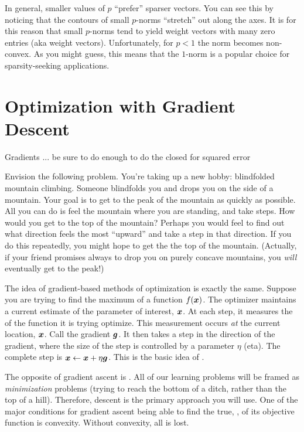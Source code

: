 
In general, smaller values of $p$ ``prefer'' sparser vectors.  You can
see this by noticing that the contours of small $p$-norms ``stretch''
out along the axes.  It is for this reason that small $p$-norms tend
to yield weight vectors with many zero entries (aka 
weight vectors).  Unfortunately, for $p<1$ the norm becomes
non-convex.  As you might guess, this means that the $1$-norm is a
popular choice for sparsity-seeking applications.

\section{Optimization with Gradient Descent}

\begin{mathreview}{Gradients}
  ... be sure to do enough to do the closed for squared error
\end{mathreview}

Envision the following problem.  You're taking up a new hobby:
blindfolded mountain climbing.  Someone blindfolds you and drops you
on the side of a mountain.  Your goal is to get to the peak of the
mountain as quickly as possible.  All you can do is feel the mountain
where you are standing, and take steps.  How would you get to the top
of the mountain?  Perhaps you would feel to find out what direction
feels the most ``upward'' and take a step in that direction.  If you
do this repeatedly, you might hope to get the the top of the mountain.
(Actually, if your friend promises always to drop you on purely
concave mountains, you \emph{will} eventually get to the peak!)

The idea of gradient-based methods of optimization is exactly the
same.  Suppose you are trying to find the maximum of a function
$f({\boldsymbol{x}})$.  The optimizer maintains a current estimate of the parameter
of interest, ${\boldsymbol{x}}$.  At each step, it measures the 
of the function it is trying optimize.  This measurement occurs
\emph{at} the current location, ${\boldsymbol{x}}$.  Call the gradient ${\boldsymbol{g}}$.  It
then takes a step in the direction of the gradient, where the size of
the step is controlled by a parameter $\eta$ (eta).  The complete step
is ${\boldsymbol{x}} \leftarrow {\boldsymbol{x}} + \eta {\boldsymbol{g}}$.  This is the basic idea of
.

The opposite of gradient ascent is .  All of
our learning problems will be framed as \emph{minimization} problems
(trying to reach the bottom of a ditch, rather than the top of a
hill).  Therefore, descent is the primary approach you will use.
One of the major conditions for gradient ascent being able to find the
true, , of its objective function is
convexity.  Without convexity, all is lost.



